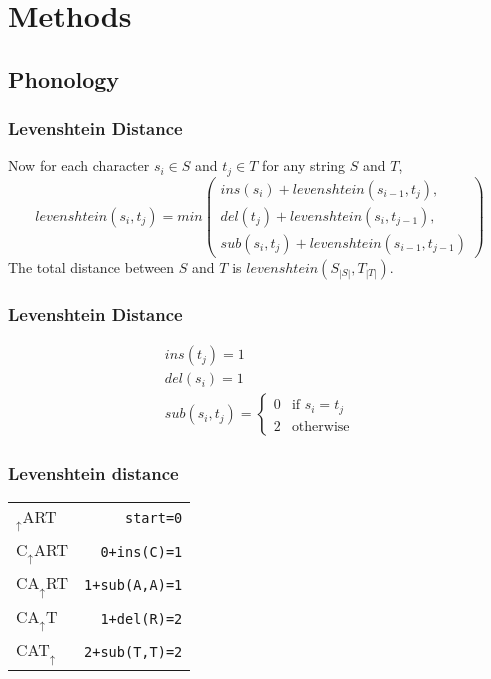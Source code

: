 \documentclass{beamer}
\begin{document}
\section{Methods}
\subsection{Phonology}
\begin{frame}
\frametitle{Levenshtein Distance}
\begin{definition}
Now for each character $s_i \in S$ and $t_j \in T$ for any string $S$ and $T$,
\begin{equation}
  levenshtein(s_i,t_j) = min \left(
  \begin{array}{l}
   ins(s_i)+levenshtein(s_{i-1},t_j), \\
 del(t_j)+levenshtein(s_i,t_{j-1}), \\
 sub(s_i,t_j)+levenshtein(s_{i-1},t_{j-1})
   \end{array} \right)
   \label{levequation}
\end{equation}
The total distance between $S$ and $T$ is $levenshtein(S_{|S|},T_{|T|})$.
\end{definition}
\end{frame}
\begin{frame}
\frametitle{Levenshtein Distance}
\begin{definition}
\begin{equation}
\begin{array}{l}
   ins(t_j) = 1 \\
   del(s_i) = 1 \\
   sub(s_i,t_j) = \left\{
     \begin{array}{ll}
       0 & \textrm{if $s_i=t_j$} \\
       2 & \textrm{otherwise}
     \end{array} \right.

   \end{array}
\end{equation}
\end{definition}
\end{frame}
\begin{frame}
  \frametitle{Levenshtein distance}
  \begin{example}
    \begin{tabular}{l|r}
    $_\uparrow$ART &   {\tt start=0} \\
\pause
    C$_\uparrow$ART & {\tt 0+ins(C)=1} \\
\pause
    CA$_\uparrow$RT & {\tt 1+sub(A,A)=1} \\
\pause
    CA$_\uparrow$T & {\tt 1+del(R)=2} \\
\pause
    CAT$_\uparrow$ & {\tt 2+sub(T,T)=2} \\
    \end{tabular}
  \end{example}

\end{frame}
\end{document}
